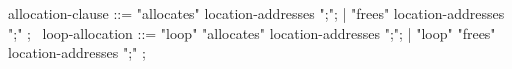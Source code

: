 \begin{syntax}
  allocation-clause ::= { "allocates" } location-addresses ";";
                    | { "frees" } location-addresses ";" ;
  \
  loop-allocation ::= { "loop" "allocates" } location-addresses ";";
                    | { "loop" "frees" } location-addresses ";" ;
\end{syntax}
